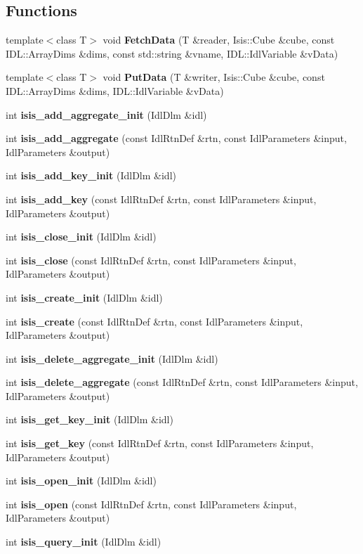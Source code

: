 \subsection*{Functions}
\begin{CompactItemize}
\item 
template$<$class T$>$ void {\bf Fetch\-Data} (T \&reader, Isis::Cube \&cube, const IDL::Array\-Dims \&dims, const std::string \&vname, IDL::Idl\-Variable \&v\-Data)
\item 
template$<$class T$>$ void {\bf Put\-Data} (T \&writer, Isis::Cube \&cube, const IDL::Array\-Dims \&dims, IDL::Idl\-Variable \&v\-Data)
\item 
int {\bf isis\_\-add\_\-aggregate\_\-init} (Idl\-Dlm \&idl)
\item 
int {\bf isis\_\-add\_\-aggregate} (const Idl\-Rtn\-Def \&rtn, const Idl\-Parameters \&input, Idl\-Parameters \&output)
\item 
int {\bf isis\_\-add\_\-key\_\-init} (Idl\-Dlm \&idl)
\item 
int {\bf isis\_\-add\_\-key} (const Idl\-Rtn\-Def \&rtn, const Idl\-Parameters \&input, Idl\-Parameters \&output)
\item 
int {\bf isis\_\-close\_\-init} (Idl\-Dlm \&idl)
\item 
int {\bf isis\_\-close} (const Idl\-Rtn\-Def \&rtn, const Idl\-Parameters \&input, Idl\-Parameters \&output)
\item 
int {\bf isis\_\-create\_\-init} (Idl\-Dlm \&idl)
\item 
int {\bf isis\_\-create} (const Idl\-Rtn\-Def \&rtn, const Idl\-Parameters \&input, Idl\-Parameters \&output)
\item 
int {\bf isis\_\-delete\_\-aggregate\_\-init} (Idl\-Dlm \&idl)
\item 
int {\bf isis\_\-delete\_\-aggregate} (const Idl\-Rtn\-Def \&rtn, const Idl\-Parameters \&input, Idl\-Parameters \&output)
\item 
int {\bf isis\_\-get\_\-key\_\-init} (Idl\-Dlm \&idl)
\item 
int {\bf isis\_\-get\_\-key} (const Idl\-Rtn\-Def \&rtn, const Idl\-Parameters \&input, Idl\-Parameters \&output)
\item 
int {\bf isis\_\-open\_\-init} (Idl\-Dlm \&idl)
\item 
int {\bf isis\_\-open} (const Idl\-Rtn\-Def \&rtn, const Idl\-Parameters \&input, Idl\-Parameters \&output)
\item 
int {\bf isis\_\-query\_\-init} (Idl\-Dlm \&idl)
\item 

\end{CompactItemize}
